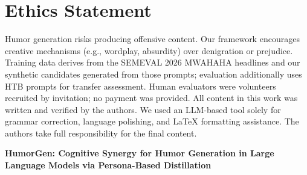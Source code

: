 \documentclass[11pt]{article}
\begin{document}
\section{Ethics Statement}
Humor generation risks producing offensive content. Our framework encourages creative mechanisms (e.g., wordplay, absurdity) over denigration or prejudice. Training data derives from the SEMEVAL 2026 MWAHAHA headlines and our synthetic candidates generated from those prompts; evaluation additionally uses HTB prompts for transfer assessment. Human evaluators were volunteers recruited by invitation; no payment was provided. All content in this work was written and verified by the authors. We used an LLM-based tool solely for grammar correction, language polishing, and LaTeX formatting assistance. The authors take full responsibility for the final content.

\clearpage
%


\clearpage
\appendix

\setcounter{topnumber}{3}
\setcounter{bottomnumber}{3}
\setcounter{totalnumber}{6}
\renewcommand{\topfraction}{0.92}
\renewcommand{\bottomfraction}{0.85}
\renewcommand{\textfraction}{0.05}
\renewcommand{\floatpagefraction}{0.88}
\setcounter{dbltopnumber}{3}
\renewcommand{\dbltopfraction}{0.92}
\renewcommand{\dblfloatpagefraction}{0.88}
\newcommand{\appendixfigcaption}[2]{%
  \par\vspace{0.35em}%
  \captionof{figure}{#1}%
  \label{#2}%
  \vspace{0.45em}%
}

\begin{center}
\large\bfseries
HumorGen: Cognitive Synergy for Humor Generation in Large Language Models via Persona-Based Distillation
\end{center}
\vspace{1.5em}
\end{document}
